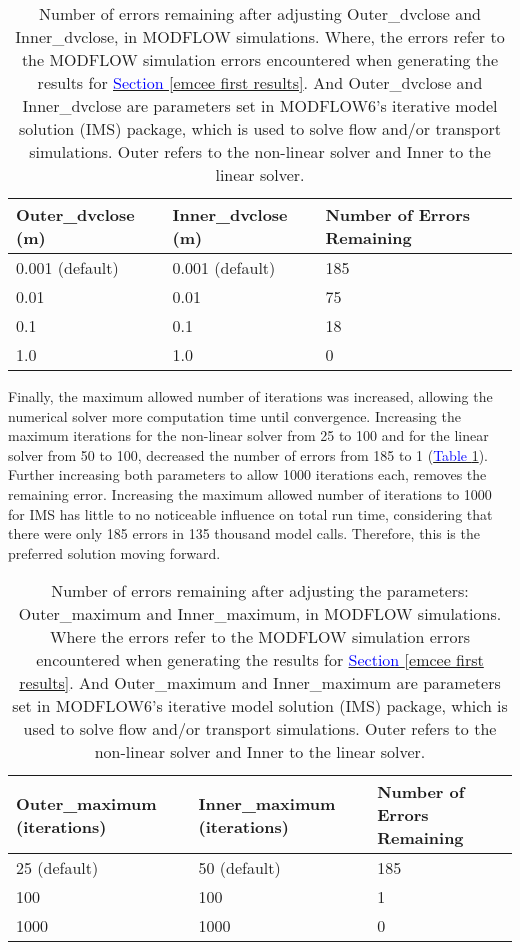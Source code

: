 \begin{table}[ht]
\centering
\caption{Number of errors remaining after adjusting Outer\_dvclose and Inner\_dvclose, in MODFLOW simulations. Where, the errors refer to the MODFLOW simulation errors encountered when generating the results for \hyperref[emcee first results]{\textcolor{blue}{Section }\ref{emcee first results}}. And Outer\_dvclose and Inner\_dvclose are parameters set in MODFLOW6's iterative model solution (IMS) package, which is used to solve flow and/or transport simulations. Outer refers to the non-linear solver and Inner to the linear solver.}
\label{tab_dvclose_errors}
\begin{tabularx}{\textwidth}{XXX}
\toprule
Outer\_dvclose (m) & Inner\_dvclose (m) & Number of Errors Remaining \\
\midrule
0.001 (default) & 0.001 (default) & 185 \\
0.01  & 0.01 & 75  \\
0.1   & 0.1  & 18  \\
1.0   & 1.0  & 0   \\
\bottomrule
\end{tabularx}
\centering
\end{table}

Finally, the maximum allowed number of iterations was increased, allowing the numerical solver more computation time until convergence. Increasing the maximum iterations for the non-linear solver from 25 to 100 and for the linear solver from 50 to 100, decreased the number of errors from 185 to 1 (\hyperref[tab_dvclose_errors]{\textcolor{blue}{Table }\ref{tab_dvclose_errors}}). Further increasing both parameters to allow 1000 iterations each, removes the remaining error. Increasing the maximum allowed number of iterations to 1000 for IMS has little to no noticeable influence on total run time, considering that there were only 185 errors in 135 thousand model calls. Therefore, this is the preferred solution moving forward.

\begin{table}[ht]
\centering
\caption{Number of errors remaining after adjusting the parameters: Outer\_maximum and Inner\_maximum, in MODFLOW simulations. Where the errors refer to the MODFLOW simulation errors encountered when generating the results for \hyperref[emcee first results]{\textcolor{blue}{Section }\ref{emcee first results}}. And Outer\_maximum and Inner\_maximum are parameters set in MODFLOW6's iterative model solution (IMS) package, which is used to solve flow and/or transport simulations. Outer refers to the non-linear solver and Inner to the linear solver.}
\label{tab_maximum_errors}
\begin{tabularx}{\textwidth}{XXX}
\toprule
Outer\_maximum (iterations) & Inner\_maximum (iterations) & Number of Errors Remaining \\
\midrule
25 (default) & 50 (default) & 185 \\
100  & 100 & 1  \\
1000   & 1000  & 0  \\
\bottomrule
\end{tabularx}
\centering
\end{table}


